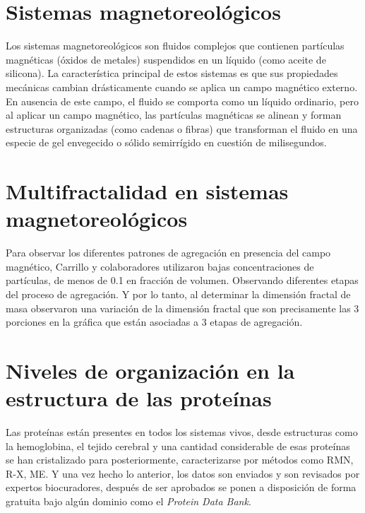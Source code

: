 \section{Sistemas magnetoreol\'{o}gicos}

Los sistemas magnetoreol\'{o}gicos son fluidos complejos que contienen part\'{i}culas magn\'{e}ticas (\'{o}xidos de metales) suspendidos en un l\'{i}quido (como aceite de silicona). La caracter\'{i}stica principal de estos sistemas es que sus propiedades mec\'{a}nicas cambian dr\'{a}sticamente cuando se aplica un campo magn\'{e}tico externo. En ausencia de este campo, el ﬂuido se comporta como un l\'{i}quido ordinario, pero al aplicar un campo magn\'{e}tico, las part\'{i}culas magn\'{e}ticas se alinean y forman estructuras organizadas (como cadenas o ﬁbras) que transforman el ﬂuido en una especie de gel envegecido o s\'{o}lido semirr\'{i}gido en cuesti\'{o}n de milisegundos. 


\section{Multifractalidad en sistemas magnetoreol\'{o}gicos}

Para observar los diferentes patrones de agregaci\'{o}n en presencia del campo magn\'{e}tico, Carrillo y colaboradores utilizaron bajas concentraciones de part\'{i}culas, de menos de 0.1 en fracci\'{o}n de volumen. Observando diferentes etapas del proceso de agregaci\'{o}n. Y por lo tanto, al determinar la dimensi\'{o}n fractal de masa observaron una variaci\'{o}n de la dimensi\'{o}n fractal que son precisamente las 3 porciones en la gr\'{a}ﬁca que est\'{a}n asociadas a 3 etapas de agregaci\'{o}n.
 
 
 
\section{Niveles de organizaci\'{o}n en la estructura de las prote\'{i}nas}


Las prote\'{i}nas est\'{a}n presentes en todos los sistemas vivos, desde estructuras como la hemoglobina, el tejido cerebral y una cantidad considerable de esas prote\'{i}nas se han cristalizado para
posteriormente, caracterizarse por m\'{e}todos como RMN, R-X, ME. Y una vez hecho lo anterior, los datos son enviados y son revisados por expertos biocuradores, despu\'{e}s de
ser aprobados se ponen a disposici\'{o}n de forma gratuita bajo algún dominio como el \textit{Protein Data Bank}.


